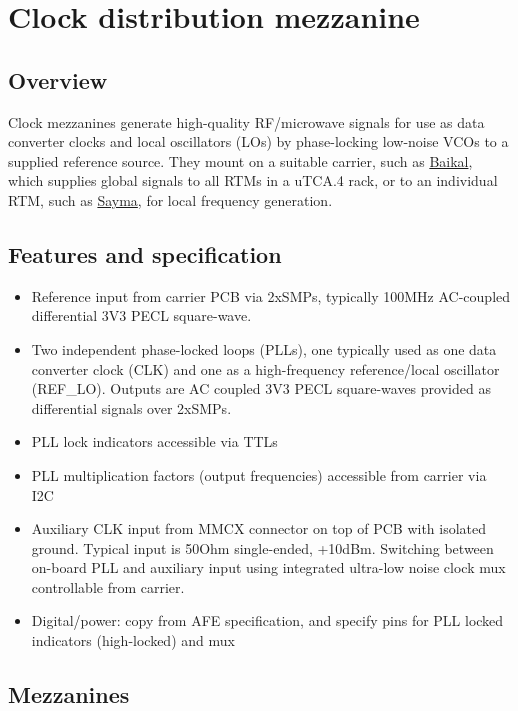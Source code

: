 \section{Clock distribution mezzanine}

\subsection{Overview}\label{overview}

Clock mezzanines generate high-quality RF/microwave signals for use as
data converter clocks and local oscillators (LOs) by phase-locking
low-noise VCOs to a supplied reference source. They mount on a suitable
carrier, such as \url{Baikal}, which supplies global signals to all RTMs
in a uTCA.4 rack, or to an individual RTM, such as \url{Sayma}, for
local frequency generation.

\subsection{Features and specification}\label{features-and-specification}

\begin{itemize}
	\item
	Reference input from carrier PCB via 2xSMPs, typically 100MHz
	AC-coupled differential 3V3 PECL square-wave.
	\item
	Two independent phase-locked loops (PLLs), one typically used as one
	data converter clock (CLK) and one as a high-frequency reference/local
	oscillator (REF\_LO). Outputs are AC coupled 3V3 PECL square-waves
	provided as differential signals over 2xSMPs.
	\item
	PLL lock indicators accessible via TTLs
	\item
	PLL multiplication factors (output frequencies) accessible from
	carrier via I2C
	\item
	Auxiliary CLK input from MMCX connector on top of PCB with isolated
	ground. Typical input is 50Ohm single-ended, +10dBm. Switching between
	on-board PLL and auxiliary input using integrated ultra-low noise
	clock mux controllable from carrier.
	\item
	Digital/power: copy from AFE specification, and specify pins for PLL
	locked indicators (high-locked) and mux
\end{itemize}

\subsection{Mezzanines}\label{mezzanines}

